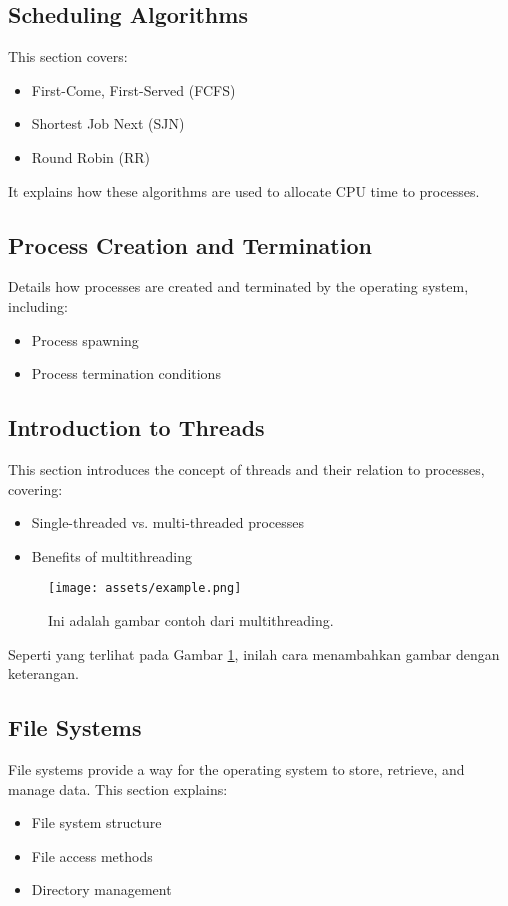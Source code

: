 \documentclass[12pt]{article}
\begin{document}
\subsection{Scheduling Algorithms}
This section covers:
\begin{itemize}
    \item First-Come, First-Served (FCFS)
    \item Shortest Job Next (SJN)
    \item Round Robin (RR)
\end{itemize}
It explains how these algorithms are used to allocate CPU time to processes.

\subsection{Process Creation and Termination}
Details how processes are created and terminated by the operating system, including:
\begin{itemize}
    \item Process spawning
    \item Process termination conditions
\end{itemize}

\subsection{Introduction to Threads}
This section introduces the concept of threads and their relation to processes, covering:
\begin{itemize}
    \item Single-threaded vs. multi-threaded processes
    \item Benefits of multithreading
\end{itemize}

\begin{figure}[h]
    \centering
    \texttt{[image: assets/example.png]}  %
    \caption{Ini adalah gambar contoh dari multithreading.}
    \label{fig:contoh_gambar}
\end{figure}

Seperti yang terlihat pada Gambar \ref{fig:contoh_gambar}, inilah cara menambahkan gambar dengan keterangan.

\subsection{File Systems}
File systems provide a way for the operating system to store, retrieve, and manage data. This section explains:
\begin{itemize}
    \item File system structure
    \item File access methods
    \item Directory management
\end{itemize}
\end{document}
